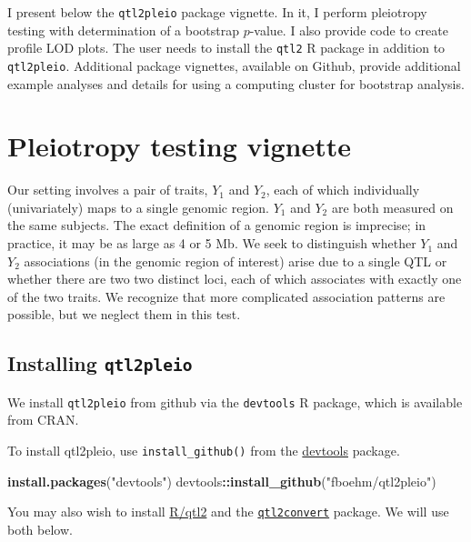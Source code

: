 \documentclass[oneside]{book}\usepackage[]{graphicx}\usepackage[]{color}
\newenvironment{Shaded}{\begin{snugshade}}{\end{snugshade}}
\newcommand{\KeywordTok}[1]{\textcolor[rgb]{0.13,0.29,0.53}{\textbf{#1}}}
\newcommand{\NormalTok}[1]{#1}
\newcommand{\OperatorTok}[1]{\textcolor[rgb]{0.81,0.36,0.00}{\textbf{#1}}}
\newcommand{\StringTok}[1]{\textcolor[rgb]{0.31,0.60,0.02}{#1}}
\begin{document}
I present below the \texttt{qtl2pleio} package vignette. In it, I perform pleiotropy testing with determination of a bootstrap $p$-value. I also provide code to create profile LOD plots. The user needs to install the \texttt{qtl2} R package in addition to \texttt{qtl2pleio}. Additional package vignettes, available on Github, provide additional example analyses and details for using a computing cluster for bootstrap analysis. 

\section{Pleiotropy testing vignette}


Our setting involves a pair of traits, \(Y_1\) and \(Y_2\), each of
which individually (univariately) maps to a single genomic region.
\(Y_1\) and \(Y_2\) are both measured on the same subjects. The exact
definition of a genomic region is imprecise; in practice, it may be as
large as 4 or 5 Mb. We seek to distinguish whether \(Y_1\) and \(Y_2\)
associations (in the genomic region of interest) arise due to a single
QTL or whether there are two two distinct loci, each of which associates
with exactly one of the two traits. We recognize that more complicated
association patterns are possible, but we neglect them in this test.

\hypertarget{installing-qtl2pleio}{%
\subsection{\texorpdfstring{Installing
\texttt{qtl2pleio}}{Installing qtl2pleio}}\label{installing-qtl2pleio}}

We install \texttt{qtl2pleio} from github via the \texttt{devtools} R
package, which is available from CRAN.

To install qtl2pleio, use \texttt{install\_github()} from the
\href{https://devtools.r-lib.org}{devtools} package.

\begin{Shaded}
\begin{Highlighting}[]
\KeywordTok{install.packages}\NormalTok{(}\StringTok{"devtools"}\NormalTok{)}
\NormalTok{devtools}\OperatorTok{::}\KeywordTok{install_github}\NormalTok{(}\StringTok{"fboehm/qtl2pleio"}\NormalTok{)}
\end{Highlighting}
\end{Shaded}

You may also wish to install \href{https://kbroman.org/qtl2}{R/qtl2} and
the \href{https://github.com/rqtl/qtl2convert}{\texttt{qtl2convert}}
package. We will use both below.
\end{document}
